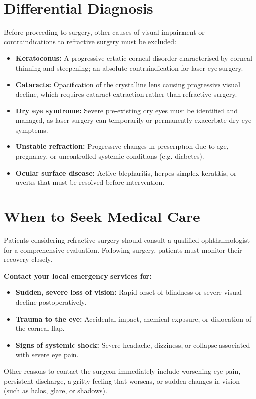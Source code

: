 \section*{Differential Diagnosis}
Before proceeding to surgery, other causes of visual impairment or contraindications to refractive surgery must be excluded:
\begin{itemize}
    \item \textbf{Keratoconus:} A progressive ectatic corneal disorder characterised by corneal thinning and steepening; an absolute contraindication for laser eye surgery.
    \item \textbf{Cataracts:} Opacification of the crystalline lens causing progressive visual decline, which requires cataract extraction rather than refractive surgery.
    \item \textbf{Dry eye syndrome:} Severe pre-existing dry eyes must be identified and managed, as laser surgery can temporarily or permanently exacerbate dry eye symptoms.
    \item \textbf{Unstable refraction:} Progressive changes in prescription due to age, pregnancy, or uncontrolled systemic conditions (e.g. diabetes).
    \item \textbf{Ocular surface disease:} Active blepharitis, herpes simplex keratitis, or uveitis that must be resolved before intervention.
\end{itemize}

\section*{When to Seek Medical Care}
Patients considering refractive surgery should consult a qualified ophthalmologist for a comprehensive evaluation. Following surgery, patients must monitor their recovery closely.

\textbf{Contact your local emergency services for:}
\begin{itemize}
    \item \textbf{Sudden, severe loss of vision:} Rapid onset of blindness or severe visual decline postoperatively.
    \item \textbf{Trauma to the eye:} Accidental impact, chemical exposure, or dislocation of the corneal flap.
    \item \textbf{Signs of systemic shock:} Severe headache, dizziness, or collapse associated with severe eye pain.
\end{itemize}
Other reasons to contact the surgeon immediately include worsening eye pain, persistent discharge, a gritty feeling that worsens, or sudden changes in vision (such as halos, glare, or shadows).

